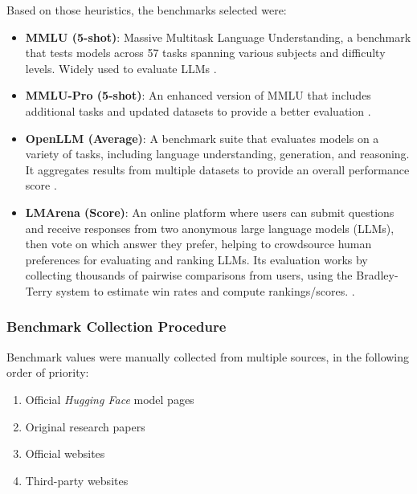         Based on those heuristics, the benchmarks selected were:
        \begin{itemize}
            \item \textbf{MMLU (5-shot)}: Massive Multitask Language Understanding, a benchmark that tests models across 57 tasks spanning various subjects and difficulty levels. Widely used to evaluate LLMs \cite{Hendrycks2020}.

            \item \textbf{MMLU-Pro (5-shot)}: An enhanced version of MMLU that includes additional tasks and updated datasets to provide a better evaluation \cite{MMPro2024}.
            
            \item \textbf{OpenLLM (Average)}: A benchmark suite that evaluates models on a variety of tasks, including language understanding, generation, and reasoning. It aggregates results from multiple datasets to provide an overall performance score \cite{Myrzakhan2024}.
            
            \item \textbf{LMArena (Score)}: An online platform where users can submit questions and receive responses from two anonymous large language models (LLMs), then vote on which answer they prefer, helping to crowdsource human preferences for evaluating and ranking LLMs. Its evaluation works by collecting thousands of pairwise comparisons from users, using the Bradley-Terry system to estimate win rates and compute rankings/scores. \cite{Chiang2024}.
        \end{itemize}

    \subsubsection{Benchmark Collection Procedure}

        Benchmark values were manually collected from multiple sources, in the following order of priority:
        \begin{enumerate}
            \item Official \textit{Hugging Face} model pages
            \item Original research papers
            \item Official websites
            \item Third-party websites
        \end{enumerate}

